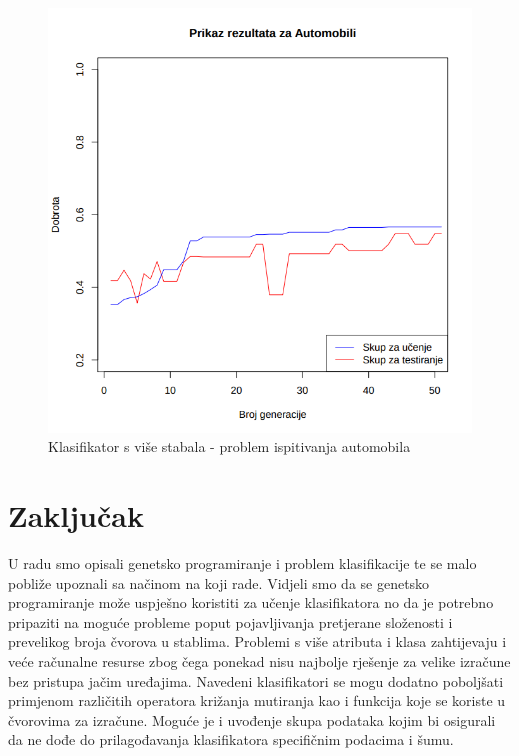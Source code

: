 \documentclass[times, utf8, zavrsni]{fer}
\begin{document}
\begin{figure}[htb]
\centering
\includegraphics[scale=0.45]{grafovi/automobili2-3}
\caption{Klasifikator s više stabala - problem ispitivanja automobila}
\end{figure}


\chapter{Zaključak}
U radu smo opisali genetsko programiranje i problem klasifikacije te se malo pobliže upoznali sa načinom na koji rade. Vidjeli smo da se genetsko programiranje može uspješno koristiti za učenje klasifikatora no da je potrebno pripaziti na moguće probleme poput pojavljivanja pretjerane složenosti i prevelikog broja čvorova u stablima. Problemi s više atributa i klasa zahtijevaju i veće računalne resurse zbog čega ponekad nisu najbolje rješenje za velike izračune bez pristupa jačim uređajima. Navedeni klasifikatori se mogu dodatno poboljšati primjenom različitih operatora križanja mutiranja kao i funkcija koje se koriste u čvorovima za izračune. Moguće je i uvođenje skupa podataka kojim bi osigurali da ne dođe do prilagođavanja klasifikatora specifičnim podacima i šumu.
\end{document}
